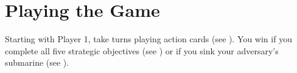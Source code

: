 \section*{Playing the Game}
Starting with Player 1, take turns playing action cards (see {}). You win if you complete all five strategic objectives (see {}) or if you sink your adversary's submarine (see {}).
